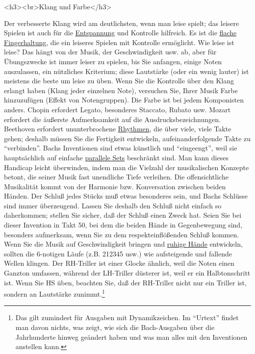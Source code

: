 <h3><br>Klang und Farbe</h3>

Der verbesserte Klang wird am deutlichsten, wenn man leise spielt; das leisere Spielen ist auch für die \hyperref[c1ii14]{Entspannung} und Kontrolle hilfreich.
Es ist die \hyperref[c1iii4b]{flache Fingerhaltung}, die ein leiseres Spielen mit Kontrolle ermöglicht.
Wie leise ist leise?
Das hängt von der Musik, der Geschwindigkeit usw. ab, aber für Übungszwecke ist immer leiser zu spielen, bis Sie anfangen, einige Noten auszulassen, ein nützliches Kriterium; diese Lautstärke (oder ein wenig lauter) ist meistens die beste um leise zu üben.
Wenn Sie die Kontrolle über den Klang erlangt haben (Klang jeder einzelnen Note), versuchen Sie, Ihrer Musik Farbe hinzuzufügen (Effekt von Notengruppen).
Die Farbe ist bei jedem Komponisten anders.
Chopin erfordert Legato, besonderes Staccato, Rubato usw.
Mozart erfordert die äußerste Aufmerksamkeit auf die Ausdrucksbezeichnungen.
Beethoven erfordert ununterbrochene \hyperref[c1iii1b]{Rhythmen}, die über viele, viele Takte gehen; deshalb müssen Sie die Fertigkeit entwickeln, aufeinanderfolgende Takte zu \enquote{verbinden}.
Bachs Inventionen sind etwas künstlich und \enquote{eingeengt}, weil sie hauptsächlich auf einfache \hyperref[c1iii7b]{parallele Sets} beschränkt sind.
Man kann dieses Handicap leicht überwinden, indem man die Vielzahl der musikalischen Konzepte betont, die seiner Musik fast unendliche Tiefe verleihen.
Die offensichtliche Musikalität kommt von der Harmonie bzw. Konversation zwischen beiden Händen.
Der Schluß jedes Stücks muß etwas besonderes sein, und Bachs Schlüsse sind immer überzeugend.
Lassen Sie deshalb den Schluß nicht einfach so daherkommen; stellen Sie sicher, daß der Schluß einen Zweck hat.
Seien Sie bei dieser Invention in Takt 50, bei dem die beiden Hände in Gegenbewegung sind, besonders aufmerksam, wenn Sie zu dem respekteinflößenden Schluß kommen.
Wenn Sie die Musik auf Geschwindigkeit bringen und \hyperref[ruhig]{ruhige Hände} entwickeln, sollten die 6-notigen Läufe (z.B. 212345 usw.) wie aufsteigende und fallende Wellen klingen.
Der RH-Triller ist einer Glocke ähnlich, weil die Noten einen Ganzton umfassen, während der LH-Triller düsterer ist, weil er ein Halbtonschritt ist.
Wenn Sie HS üben, beachten Sie, daß der RH-Triller nicht nur ein Triller ist, sondern an Lautstärke zunimmt.\footnote{Das gilt zumindest für Ausgaben mit Dynamikzeichen. Im \enquote{Urtext} findet man davon nichts, was zeigt, wie sich die Bach-Ausgaben über die Jahrhunderte hinweg geändert haben und was man alles mit den Inventionen anstellen kann.}
